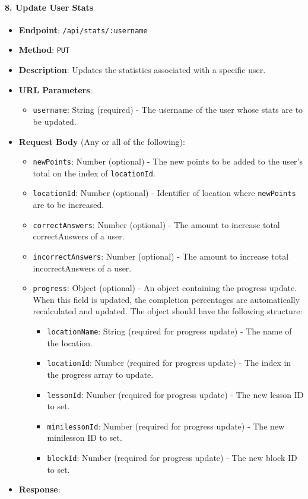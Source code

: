 \hypertarget{update-user-stats}{%
\paragraph{8. Update User Stats}\label{update-user-stats}}

\begin{itemize}
\tightlist
\item
  \textbf{Endpoint}: \texttt{/api/stats/:username}
\item
  \textbf{Method}: \texttt{PUT}
\item
  \textbf{Description}: Updates the statistics associated with a
  specific user.
\item
  \textbf{URL Parameters}:

  \begin{itemize}
  \tightlist
  \item
    \texttt{username}: String (required) - The username of the user
    whose stats are to be updated.
  \end{itemize}
\item
  \textbf{Request Body} (Any or all of the following):

  \begin{itemize}
  \tightlist
  \item
    \texttt{newPoints}: Number (optional) - The new points to be added
    to the user's total on the index of \texttt{locationId}.
  \item
    \texttt{locationId}: Number (optional) - Identifier of location
    where \texttt{newPoints} are to be increased.
  \item
    \texttt{correctAnswers}: Number (optional) - The amount to increase
    total correctAnswers of a user.
  \item
    \texttt{incorrectAnswers}: Number (optional) - The amount to
    increase total incorrectAnswers of a user.
  \item
    \texttt{progress}: Object (optional) - An object containing the
    progress update. When this field is updated, the completion
    percentages are automatically recalculated and updated. The object
    should have the following structure:

    \begin{itemize}
    \tightlist
    \item
      \texttt{locationName}: String (required for progress update) - The
      name of the location.
    \item
      \texttt{locationId}: Number (required for progress update) - The
      index in the progress array to update.
    \item
      \texttt{lessonId}: Number (required for progress update) - The new
      lesson ID to set.
    \item
      \texttt{minilessonId}: Number (required for progress update) - The
      new minilesson ID to set.
    \item
      \texttt{blockId}: Number (required for progress update) - The new
      block ID to set.
    \end{itemize}
  \end{itemize}
\item
  \textbf{Response}:


\end{itemize}
